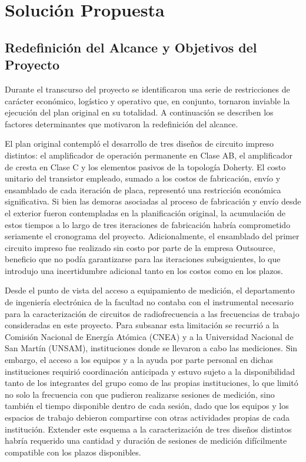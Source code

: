 \chapter[Solución Propuesta]{Solución Propuesta} \label{sec:solucion_propuesta}

\section{Redefinición del Alcance y Objetivos del Proyecto}
Durante el transcurso del proyecto se identificaron una serie de restricciones de carácter económico, logístico y operativo que, en conjunto, tornaron inviable la ejecución del plan original en su totalidad. A continuación se describen los factores determinantes que motivaron la redefinición del alcance.

El plan original contempló el desarrollo de tres diseños de circuito impreso distintos: el amplificador de operación permanente en Clase AB, el amplificador de cresta en Clase C y los elementos pasivos de la topología Doherty. El costo unitario del transistor empleado, sumado a los costos de fabricación, envío y ensamblado de cada iteración de placa, representó una restricción económica significativa. Si bien las demoras asociadas al proceso de fabricación y envío desde el exterior fueron contempladas en la planificación original, la acumulación de estos tiempos a lo largo de tres iteraciones de fabricación habría comprometido seriamente el cronograma del proyecto. Adicionalmente, el ensamblado del primer circuito impreso fue realizado sin costo por parte de la empresa Outsource, beneficio que no podía garantizarse para las iteraciones subsiguientes, lo que introdujo una incertidumbre adicional tanto en los costos como en los plazos.

Desde el punto de vista del acceso a equipamiento de medición, el departamento de ingeniería electrónica de la facultad no contaba con el instrumental necesario para la caracterización de circuitos de radiofrecuencia a las frecuencias de trabajo consideradas en este proyecto. Para subsanar esta limitación se recurrió a la Comisión Nacional de Energía Atómica (CNEA) y a la Universidad Nacional de San Martín (UNSAM), instituciones donde se llevaron a cabo las mediciones. Sin embargo, el acceso a los equipos y a la ayuda por parte personal en dichas instituciones requirió coordinación anticipada y estuvo sujeto a la disponibilidad tanto de los integrantes del grupo como de las propias instituciones, lo que limitó no solo la frecuencia con que pudieron realizarse sesiones de medición, sino también el tiempo disponible dentro de cada sesión, dado que los equipos y los espacios de trabajo debieron compartirse con otras actividades propias de cada institución. Extender este esquema a la caracterización de tres diseños distintos habría requerido una cantidad y duración de sesiones de medición difícilmente compatible con los plazos disponibles.


